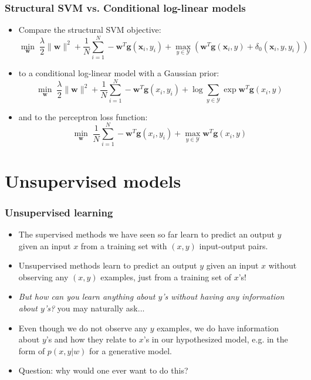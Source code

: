 \documentclass[ignorenonframetext,plain,fleqn]{beamer}
\renewcommand{\vec}{\mathbf}
\begin{document}
\begin{frame}\frametitle{Structural SVM vs. Conditional log-linear models}
\begin{itemize}
\item Compare the structural SVM objective: \[
\min_\vec{w}\; 
 \frac{\lambda}{2} \|\vec{w}\|^2
+ \frac{1}{N} \sum_{i=1}^N 
-  \vec{w}^T\vec{g}(\vec{x}_i,y_i) + \max_{y\in\mathcal{Y}}
(  \vec{w}^T\vec{g}(\vec{x}_i,y) + \delta_0(\vec{x}_i,y,y_i))
\]
\item to a conditional log-linear model with a Gaussian prior: \[
\min_\vec{w}\;
 \frac{\lambda}{2} \|\vec{w}\|^2
+ \frac{1}{N} \sum_{i=1}^N 
-\vec{w}^T \vec{g}(x_i,y_i) 
+\log \sum_{y\in\mathcal{Y}} \exp \vec{w}^T \vec{g}(x_i,y) 
\]
\item and to the perceptron loss function: \[
\min_\vec{w}\;
\frac{1}{N} \sum_{i=1}^N 
-\vec{w}^T \vec{g}(x_i,y_i)
+\max_{y\in\mathcal{Y}} \vec{w}^T \vec{g}(x_i,y)
\]
\end{itemize}
\end{frame}

\section{Unsupervised models}
\frame{\sectionpage}

\begin{frame}\frametitle{Unsupervised learning}
\begin{itemize}
\item The supervised methods we have seen so far learn to predict an
  output $y$ given an input $x$ from a training set with $(x, y)$
  input-output pairs.
\item Unsupervised methods learn to predict an output $y$ given an
  input $x$ without observing any $(x, y)$ examples, just from a
  training set of $x$'s!
\item {\sl But how can you learn anything about $y$'s without having
  any information about $y$'s?} you may naturally ask...
\item Even though we do not observe any $y$ examples, we do have
  information about $y$'s and how they relate to $x$'s in our
  hypothesized model, e.g. in the form of $p(x,y|w)$ for a
  generative model.
\item Question: why would one ever want to do this?
\end{itemize}
\end{frame}
\end{document}
